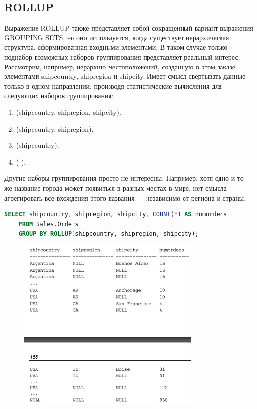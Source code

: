 \subsection{ROLLUP}


Выражение ROLLUP также представляет собой сокращенный вариант выражения
GROUPING SETS, но оно используется, когда существует иерархическая структура,
сформированная входными элементами. В таком случае только поднабор возможных наборов группирования представляет реальный интерес.
Рассмотрим, например, иерархию местоположений, созданную в этом заказе элементами shipcountry,
shipregion и shipcity. Имеет смысл свертывать данные только в одном направлении, производя статистические вычисления для следующих наборов группирования: 

\begin{enumerate}
	\item (shipcountry, shipregion, shipcity). 
	\item (shipcountry, shipregion). 
	\item (shipcountry).  
	\item ( ). 
\end{enumerate}

Другие наборы группирования просто не интересны. Например, хотя одно и то же
название города может появиться в разных местах в мире, нет смысла агрегировать
все вхождения этого названия — независимо от региона и страны. 

\begin{lstlisting}[label=lst:funcReturn, language=sql]
	SELECT shipcountry, shipregion, shipcity, COUNT(*) AS numorders
	FROM Sales.Orders
	GROUP BY ROLLUP(shipcountry, shipregion, shipcity); 
\end{lstlisting}

\begin{figure}[h!]
	\begin{center}
		\includegraphics[width=0.8\textwidth]{img/res12.png}
	\end{center}
	\captionsetup{justification=centering}
\end{figure}


